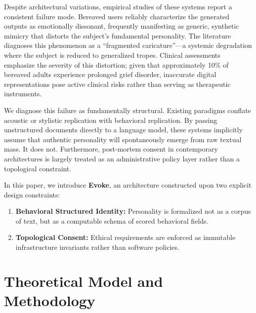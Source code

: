 \documentclass[journal]{IEEEtran}
\begin{document}
Despite architectural variations, empirical studies of these systems report a consistent failure mode. Bereaved users reliably characterize the generated outputs as emotionally dissonant, frequently manifesting as generic, synthetic mimicry that distorts the subject's fundamental personality. The literature diagnoses this phenomenon as a ``fragmented caricature''---a systemic degradation where the subject is reduced to generalized tropes. Clinical assessments emphasize the severity of this distortion; given that approximately 10\% of bereaved adults experience prolonged grief disorder, inaccurate digital representations pose active clinical risks rather than serving as therapeutic instruments.

We diagnose this failure as fundamentally structural. Existing paradigms conflate acoustic or stylistic replication with behavioral replication. By passing unstructured documents directly to a language model, these systems implicitly assume that authentic personality will spontaneously emerge from raw textual mass. It does not. Furthermore, post-mortem consent in contemporary architectures is largely treated as an administrative policy layer rather than a topological constraint.

In this paper, we introduce \textbf{Evoke}, an architecture constructed upon two explicit design constraints:
\begin{enumerate}
    \item \textbf{Behavioral Structured Identity:} Personality is formalized not as a corpus of text, but as a computable schema of scored behavioral fields.
    \item \textbf{Topological Consent:} Ethical requirements are enforced as immutable infrastructure invariants rather than software policies.
\end{enumerate}

\section{Theoretical Model and Methodology}
\end{document}

